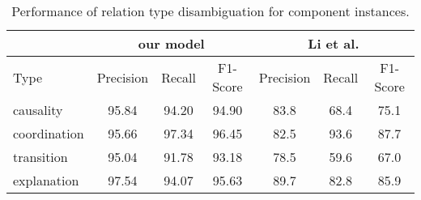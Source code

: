 \begin{table}[!htbp]
\centering
\begin{tabular}{|l|c|c|c|c|c|c|}
\hline

                        & \multicolumn{3}{c|}{our model}            & \multicolumn{3}{c|}{Li et al.}            \\ \hline
    Type                &     Precision &     Recall &     F1-Score &     Precision &     Recall &     F1-Score \\ \hline
    causality           &     95.84     &     94.20  &     94.90    &     83.8      &     68.4   &     75.1     \\ \hline
    coordination        &     95.66     &     97.34  &     96.45    &     82.5      &     93.6   &     87.7     \\ \hline
    transition          &     95.04     &     91.78  &     93.18    &     78.5      &     59.6   &     67.0     \\ \hline
    explanation         &     97.54     &     94.07  &     95.63    &     89.7      &     82.8   &     85.9     \\ \hline

\end{tabular}
\caption{\label{t:sense-word-types} Performance of relation type
disambiguation for component instances. }
\end{table}
